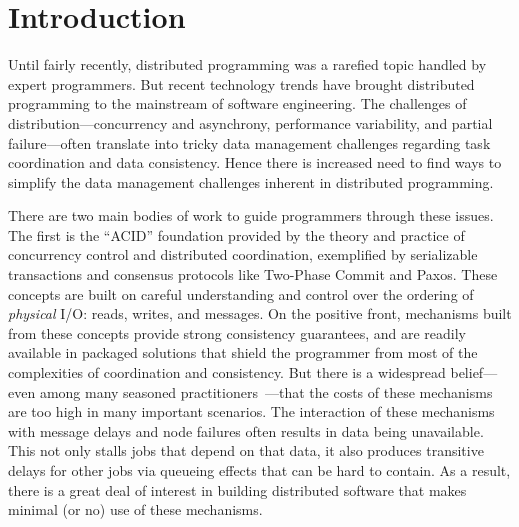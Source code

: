 \section{Introduction}
Until fairly recently, distributed programming was a rarefied topic handled by expert programmers. But recent technology trends have brought distributed programming to the mainstream of software engineering.  The challenges of distribution---concurrency and asynchrony, performance variability, and partial failure---often translate into tricky data management challenges regarding task coordination and data consistency.
Hence there is increased need to find ways to simplify the data management challenges inherent in distributed programming.

There are two main bodies of work to guide programmers through these issues.  The first is the ``ACID'' foundation provided by the theory and practice of concurrency control and distributed coordination, exemplified by serializable transactions and consensus protocols like Two-Phase Commit and Paxos.  These concepts are built on careful understanding and control over the ordering of {\em physical} I/O: reads, writes, and messages.  On the positive front, mechanisms built from these concepts provide strong consistency guarantees, and are readily available in packaged solutions that shield the programmer from most of the complexities of coordination and consistency.  But there is a widespread belief---even among many seasoned practitioners~\cite{ladis}---that the costs of these mechanisms are too high in many important scenarios.  The interaction of these mechanisms with message delays and node failures often results in data being unavailable. This not only stalls jobs that depend on that data, it also produces transitive delays for other jobs via queueing effects that can be hard to contain.  As a result, there is a great deal of interest in building distributed software that makes minimal (or no) use of these mechanisms.

